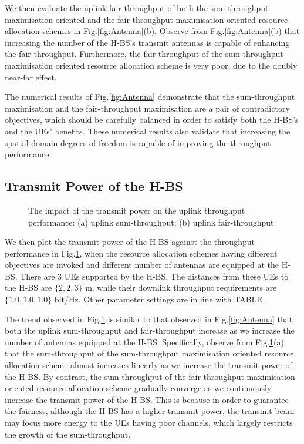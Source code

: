 \documentclass[12pt,draft,onecolumn,journal]{IEEEtran}
\begin{document}
We then evaluate the uplink fair-throughput of both the sum-throughput maximisation oriented and the fair-throughput maximisation oriented resource allocation schemes in Fig.\ref{fig:Antenna}(b). Observe from Fig.\ref{fig:Antenna}(b) that increasing the number of the H-BS's transmit antennas is capable of enhancing the fair-throughput. Furthermore, the fair-throughput of the sum-throughput maximisation oriented resource allocation scheme is very poor, due to the doubly near-far effect.

The numerical results of Fig.\ref{fig:Antenna} demonstrate that the sum-throughput maximisation and the fair-throughput maximisation are a pair of contradictory objectives, which should be carefully balanced in order to satisfy both the H-BS's and the UEs' benefits. These numerical results also validate that increasing the spatial-domain degrees of freedom is capable of improving the throughput performance.

\subsection{Transmit Power of the H-BS}

\begin{figure}[!t]
\setlength{\abovecaptionskip}{0pt}
\setlength{\belowcaptionskip}{0pt}\caption{The impact of the transmit power on the uplink throughput performance: (a) uplink sum-throughput; (b) uplink fair-throughput.}
\label{fig:TxPower}
\end{figure}

We then plot the transmit power of the H-BS against the throughput performance in Fig.\ref{fig:TxPower}, when the resource allocation schemes having different objectives are invoked and different number of antennas are equipped at the H-BS. There are $3$ UEs supported by the H-BS. The distances from these UEs to the H-BS are $\{2,2,3\}$ m, while their downlink throughput requirements are $\{1.0,1.0,1.0\}$ bit/Hz. Other parameter settings are in line with TABLE \uppercase\expandafter{}.

The trend observed in Fig.\ref{fig:TxPower} is similar to that observed in Fig.\ref{fig:Antenna} that both the uplink sum-throughput and fair-throughput increase as we increase the number of antennas equipped at the H-BS. Specifically, observe from Fig.\ref{fig:TxPower}(a) that the sum-throughput of the sum-throughput maximisation oriented resource allocation scheme almost increases linearly as we increase the transmit power of the H-BS. By contrast, the sum-throughput of the fair-throughput maximisation oriented resource allocation scheme gradually converge as we continuously increase the transmit power of the H-BS. This is because in order to guarantee the fairness, although the H-BS has a higher transmit power, the transmit beam may focus more energy to the UEs having poor channels, which largely restricts the growth of the sum-throughput.
\end{document}
